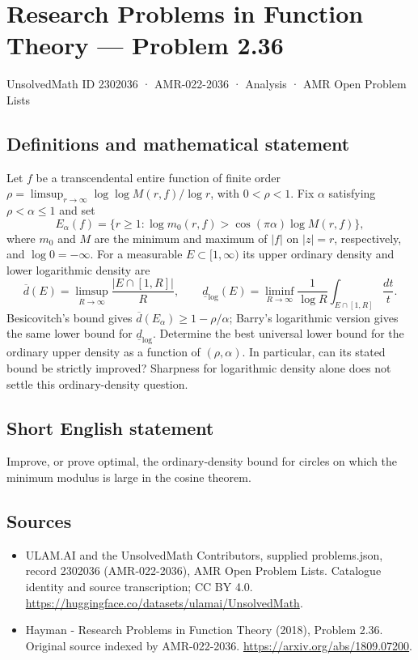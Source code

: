 \documentclass[11pt,a4paper]{article}
\begin{document}
\section*{Research Problems in Function Theory — Problem 2.36}\label{2302036}
{\small UnsolvedMath ID 2302036 · AMR-022-2036 · Analysis · AMR Open Problem Lists}
\subsection{Definitions and mathematical statement}
Let $f$ be a transcendental entire function of finite order
$\rho=\limsup_{r\to\infty}\log\log M(r,f)/\log r$, with $0<\rho<1$.
Fix $\alpha$ satisfying $\rho<\alpha\le1$ and set
\[
E_\alpha(f)=\{r\ge1:\log m_0(r,f)>\cos(\pi\alpha)\log M(r,f)\},
\]
where $m_0$ and $M$ are the minimum and maximum of $|f|$ on $|z|=r$, respectively, and $\log0=-\infty$.
For a measurable $E\subset[1,\infty)$ its upper ordinary density and lower logarithmic density are
\[
\overline d(E)=\limsup_{R\to\infty}\frac{|E\cap[1,R]|}{R},
\qquad
\underline d_{\log}(E)=\liminf_{R\to\infty}\frac1{\log R}\int_{E\cap[1,R]}\frac{dt}{t}.
\]
Besicovitch's bound gives $\overline d(E_\alpha)\ge1-\rho/\alpha$; Barry's logarithmic version gives the same lower bound for $\underline d_{\log}$. Determine the best universal lower bound for the ordinary upper density as a function of $(\rho,\alpha)$. In particular, can its stated bound be strictly improved? Sharpness for logarithmic density alone does not settle this ordinary-density question.
\subsection{Short English statement}
Improve, or prove optimal, the ordinary-density bound for circles on which the minimum modulus is large in the cosine theorem.
\subsection{Sources}
\begin{itemize}
\item[S1] ULAM.AI and the UnsolvedMath Contributors, supplied problems.json, record 2302036 (AMR-022-2036), AMR Open Problem Lists. Catalogue identity and source transcription; CC BY 4.0.
\url{https://huggingface.co/datasets/ulamai/UnsolvedMath}.
\item[S2] Hayman - Research Problems in Function Theory (2018), Problem 2.36. Original source indexed by AMR-022-2036.
\url{https://arxiv.org/abs/1809.07200}.
\end{itemize}
\end{document}
